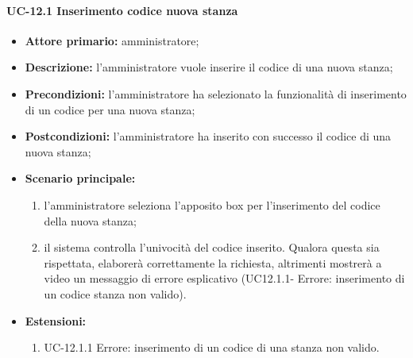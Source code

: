 \paragraph{UC-12.1 Inserimento codice nuova stanza}
   \begin{itemize}
	\item \textbf{Attore primario:} amministratore;
	\item \textbf{Descrizione:} l'amministratore vuole inserire il codice di una nuova stanza;
	\item \textbf{Precondizioni:} l'amministratore ha selezionato la funzionalità di inserimento di un codice per una nuova stanza;
	\item \textbf{Postcondizioni:} l'amministratore ha inserito con successo il codice di una nuova stanza;
	\item \textbf{Scenario principale:}
	      \begin{enumerate}
		      \item l'amministratore seleziona l'apposito box per l'inserimento del codice della nuova stanza;
		      \item il sistema controlla l'univocità del codice inserito. Qualora questa sia rispettata, elaborerà correttamente la richiesta, altrimenti mostrerà a video un messaggio di errore esplicativo (UC12.1.1- Errore: inserimento di un codice stanza non valido).
	      \end{enumerate}
	\item \textbf{Estensioni:}
		\begin{enumerate}
		      \item UC-12.1.1 Errore: inserimento di un codice di una stanza non valido.
	      \end{enumerate}
\end{itemize}


